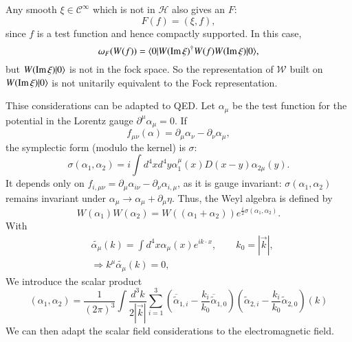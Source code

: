 Any smooth $\xi \in \mathcal{C}^\infty$ which is not in $\mathcal{H}$ also gives an $F$:
\begin{equation}
  F(f)= (\xi, f), \label{chap1-eq2.25}
\end{equation}
since $f$ is a test function and hence compactly supported. In this case,
\begin{equation}
\omega_F (W(f))= \langle 0| W (\operatorname{\mathrm{Im}} \xi)^\dagger W (f)W (\operatorname{\mathrm{Im}} \xi)|0\rangle, \label{chap1-eq2.26}
\end{equation}
but $W (\operatorname{\mathrm{Im}} \xi)|0 \rangle$ is not in the fock space. So the representation of $\mathcal{W}$ built on $W (\operatorname{\mathrm{Im}} \xi)|0 \rangle$ is not unitarily equivalent to the Fock representation.

Thise considerations can be adapted to QED. Let $\alpha_\mu$ be the test function for the potential in the Lorentz gauge $\partial^\mu \alpha_\mu =0$. If
\begin{equation}
f_{\mu \nu} (\alpha) = \partial_{\mu} \alpha_{\nu}- \partial_\nu \alpha_\mu, \label{chap1-eq-2.27}
\end{equation}
the symplectic form (modulo the kernel) is $\sigma:$
\begin{equation}
  \sigma (\alpha_1, \alpha_2) = i \int d^4 x d^4 y \alpha^\mu_1 (x) D (x-y) \alpha_{2 \mu} (y). \label{chap1-eq2.28}
\end{equation}
It depends only on $f_{i, \mu \nu}= \partial_\mu \alpha_{i \nu}- \partial_\nu \alpha_{i, \mu}$, as it is gauge invariant: $\sigma(\alpha_1, \alpha_2)$ remains invariant under $\alpha_\mu \to \alpha_\mu + \partial_{\mu} \eta$. Thus, the Weyl algebra is defined by
\begin{equation}
W (\alpha_1) W (\alpha_2)= W ((\alpha_1 + \alpha_2)) e^{\frac{i}{2} \sigma(\alpha_1, \alpha_2)}. \label{chap1-eq2.29}
\end{equation}
With
\begin{align}
  &\tilde{\alpha_\mu} (k) = \int d^4 x \alpha_\mu (x)e^{ik\cdot x}, \qquad k_0 = |\overrightarrow{k}|,\label{chap1-eq2.30}\\
  &\Longrightarrow k^{\mu} \tilde{\alpha_\mu} (k)=0,\label{chap1-eq2.31}
\end{align}
We introduce the scalar product
\begin{equation}
(\alpha_1, \alpha_2)= \frac{1}{(2\pi)^3} \int \frac{d^3 k}{2|\overrightarrow{k}|} \sum^3_{i=1} \left(\overline{\tilde{\alpha}}_{1, i} -  \frac{k_i}{k_0} \overline{\tilde{\alpha}}_{1, 0}\right) (\tilde{\alpha}_{2, i}- \frac{k_i}{k_0} \tilde{\alpha}_{2, 0})(k) \label{chap1-eq2.32}
\end{equation}
We can then adapt the scalar field considerations to the electromagnetic field.

